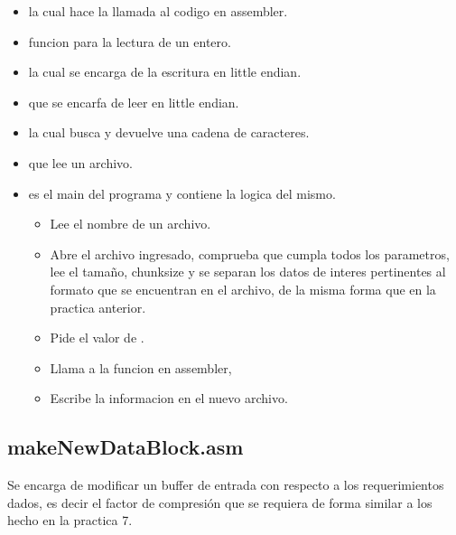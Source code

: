 \begin{itemize}
    \item \textbf{} la cual hace la llamada al codigo en assembler.
    \item  \textbf{} funcion para la lectura de un entero.
    \item \textbf{} la cual se encarga de la escritura
        en little endian.
    \item \textbf{}  que se encarfa de leer en little
        endian.
    \item \textbf{} la cual busca y devuelve una cadena de
        caracteres.
    \item \textbf{} que lee un archivo.
    \item \textbf{} es el main del programa y contiene la logica
        del mismo.

        \begin{itemize}
            \item Lee el nombre de un archivo.
            \item Abre el archivo ingresado, comprueba que cumpla todos los
                parametros, lee el tamaño, chunksize y se separan los datos de
                interes pertinentes al formato que se encuentran en el archivo,
                de la misma forma que en la practica anterior.
            \item Pide el valor de .
            \item Llama a la funcion en assembler,
            \item Escribe la informacion en el nuevo archivo.
        \end{itemize}
\end{itemize}

\subsection*{makeNewDataBlock.asm}\label{asm}

Se encarga de modificar un buffer de entrada con respecto a los requerimientos
dados, es decir el factor  de compresión que se requiera de forma
similar a los hecho en la practica 7.


























